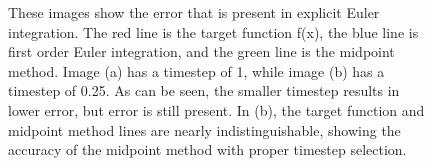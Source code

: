 \documentclass{thesis}
\begin{document}
\begin{figure}
\centering
{}
\caption[Euler integration]{These images show the error that is present in explicit Euler integration.  The red line is the target
function f(x), the blue line is first order Euler integration, and the green line is the midpoint method.  Image (a) has a timestep of 1,
while image (b) has a timestep of 0.25.  As can be seen, the smaller timestep results in lower error, but error is still present.
In (b), the target function and midpoint method lines are nearly indistinguishable, showing the accuracy of the midpoint method with
proper timestep selection.}
\label{fig:euler_integration}
\end{figure}
\end{document}
